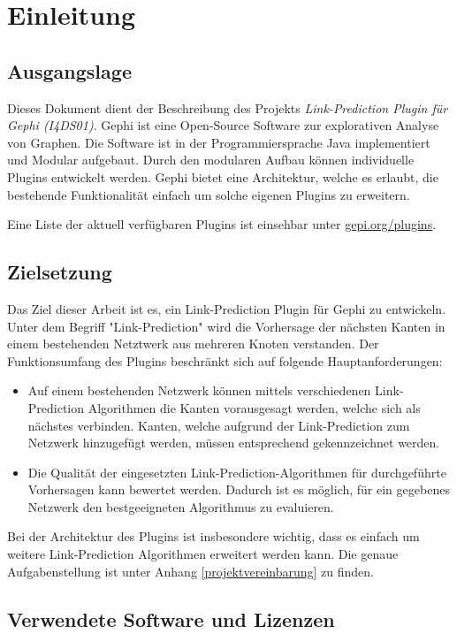 \chapter{Einleitung}
\section{Ausgangslage}
Dieses Dokument dient der Beschreibung des Projekts \textit{Link-Prediction Plugin für Gephi (I4DS01)}.
Gephi ist eine Open-Source Software zur explorativen Analyse von Graphen. Die Software ist in der Programmiersprache Java implementiert und Modular aufgebaut. Durch den modularen Aufbau können individuelle Plugins entwickelt werden. Gephi bietet eine Architektur, welche es erlaubt, die bestehende Funktionalität einfach um solche eigenen Plugins zu erweitern.

Eine Liste der aktuell verfügbaren Plugins ist einsehbar unter \href{https://gephi.org/plugins}{gepi.org/plugins}.

\section{Zielsetzung}

Das Ziel dieser Arbeit ist es, ein Link-Prediction Plugin für Gephi zu entwickeln. Unter dem Begriff "Link-Prediction" wird die Vorhersage der nächsten Kanten in einem bestehenden Netztwerk aus mehreren Knoten verstanden.
Der Funktionsumfang des Plugins beschränkt sich auf folgende Hauptanforderungen:

\begin{itemize}
    \item Auf einem bestehenden Netzwerk können mittels verschiedenen Link-Prediction Algorithmen die Kanten vorausgesagt werden, welche sich als nächstes verbinden. Kanten, welche aufgrund der Link-Prediction zum Netzwerk hinzugefügt werden, müssen entsprechend gekennzeichnet werden.
    \item Die Qualität der eingesetzten Link-Prediction-Algorithmen für durchgeführte Vorhersagen kann bewertet werden. Dadurch ist es möglich, für ein gegebenes Netzwerk den bestgeeigneten Algorithmus zu evaluieren.
\end{itemize}

Bei der Architektur des Plugins ist insbesondere wichtig, dass es einfach um weitere Link-Prediction Algorithmen erweitert werden kann.
Die genaue Aufgabenstellung ist unter Anhang \ref{projektvereinbarung} zu finden.

\section{Verwendete Software und Lizenzen}


